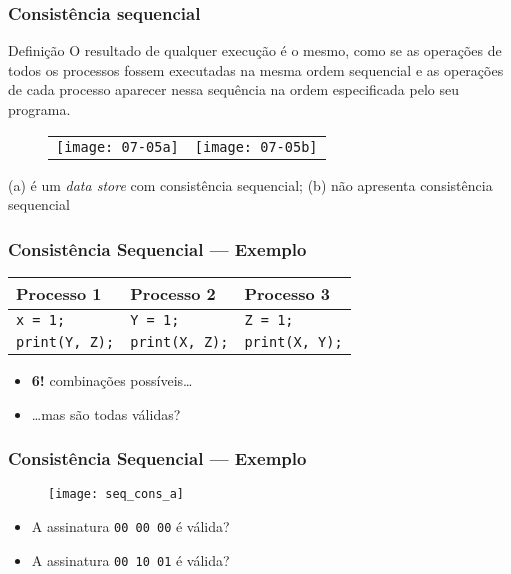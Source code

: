 \documentclass[Ligatures=TeX,table,brazil,svgnames,usetotalslideindicator,compress,10pt]{beamer}
\begin{document}
\begin{frame}
  \frametitle{Consistência sequencial}

  \begin{block}{Definição}
    O resultado de qualquer execução é o mesmo, como se as operações de
    todos os processos fossem executadas na mesma ordem sequencial e as
    operações de cada processo aparecer nessa sequência na ordem
    especificada pelo seu programa.
  \end{block}

  \begin{figure}
  \begin{tabular}{cc}
    \texttt{[image: 07-05a]} &
    \texttt{[image: 07-05b]}
  \end{tabular}
\end{figure}

(a) é um \textit{data store} com consistência sequencial; (b) não apresenta consistência sequencial

\end{frame}

\begin{frame}
  \frametitle{Consistência Sequencial --- Exemplo}
  \begin{table}[]
    \begin{tabular}{lll}
      \textbf{Processo 1} & \textbf{Processo 2} & \textbf{Processo 3} \\ \hline
      \texttt{x = 1;}               & \texttt{Y = 1;}       & \texttt{Z = 1;}\\
      \texttt{print(Y, Z);}         & \texttt{print(X, Z);} & \texttt{print(X, Y);}

    \end{tabular}
  \end{table}
  \pause
  \begin{itemize}
  \item \textbf{6!} combinações possíveis\ldots
  \item<3-> \ldots mas são todas \alert{válidas}?
  \end{itemize}

\end{frame}


\begin{frame}
  \frametitle{Consistência Sequencial --- Exemplo}
  \begin{figure}
    \texttt{[image: seq\_cons\_a]}
  \end{figure}
  \begin{itemize}
  \pause
  \item A assinatura \alert{\texttt{00 00 00}} é válida?
  \pause
  \item A assinatura \alert{\texttt{00 10 01}} é válida?
  \end{itemize}
\end{frame}
\end{document}
